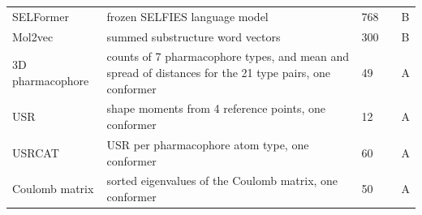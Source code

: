\begin{longtable}{p{3.2cm}p{5.6cm}p{1.6cm}p{1.6cm}p{1.4cm}}
SELFormer & frozen SELFIES language model & 768 & \citep{Yuksel2023} & B \\
Mol2vec & summed substructure word vectors & 300 & \citep{Jaeger2018} & B \\
3D pharmacophore & counts of 7 pharmacophore types, and mean and spread of distances for the 21 type pairs, one conformer & 49 & \citep{rdkit} & A \\
USR & shape moments from 4 reference points, one conformer & 12 & \citep{Ballester2007} & A \\
USRCAT & USR per pharmacophore atom type, one conformer & 60 & \citep{Schreyer2012} & A \\
Coulomb matrix & sorted eigenvalues of the Coulomb matrix, one conformer & 50 & \citep{Rupp2012} & A \\
\end{longtable}

